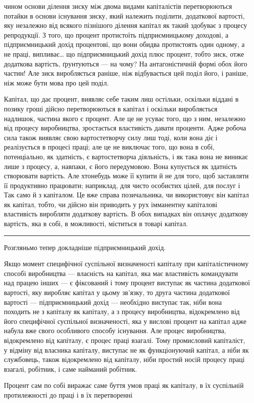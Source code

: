 \parcont{}  %
чином основи ділення зиску між двома видами капіталістів перетворюються
потайки в основи існування зиску, який належить
поділити, додаткової вартості, яку незалежно від всякого пізнішого
ділення капітал як такий здобуває з процесу репродукції.
З того, що процент протистоїть підприємницькому доходові, а
підприємницький дохід процентові, що вони обидва протистоять
один одному, а не праці, випливає\dots{} що підприємницький дохід
плюс процент, тобто зиск, отже додаткова вартість, ґрунтуються
— на чому? На антагоністичній формі обох його частин!
Але зиск виробляється раніше, ніж відбувається цей поділ його,
і раніше, ніж може бути мова про цей поділ.

Капітал, що дає процент, виявляє себе таким лиш остільки,
оскільки віддані в позику гроші дійсно перетворюються в капітал
і оскільки виробляється надлишок, частина якого є процент.
Але це не усуває того, що з ним, незалежно від процесу виробництва,
зростається властивість давати проценти. Адже робоча
сила також виявляє свою вартостетворчу силу лиш тоді, коли
вона діє і реалізується в процесі праці; але це не виключає того,
що вона в собі, потенціально, як здатність, є вартостетворча
діяльність, і як така вона не виникає лише з процесу, а, навпаки,
є його передумовою. Вона купується як здатність створювати
вартість. Але хтонебудь може її купити й не для того, щоб заставляти
її продуктивно працювати; наприклад, для чисто особистих
цілей, для послуг і~ Так само й з капіталом. Це вже справа
позичальника, чи використовує він капітал як капітал, тобто,
чи дійсно він приводить у рух імманентну капіталові властивість
виробляти додаткову вартість. В обох випадках він оплачує
додаткову вартість, яка в собі, в можливості, міститься в товарі
капітал.

\pfbreak

\noindent{}
Розгляньмо тепер докладніше підприємницький дохід.

Якщо момент специфічної суспільної визначеності капіталу
при капіталістичному способі виробництва — власність на капітал,
яка має властивість командувати над працею інших — є фіксований
і тому процент виступає як частина додаткової вартості, яку
виробляє капітал у цьому зв’язку, то друга частина додаткової
вартості — підприємницький дохід — необхідно виступає так, ніби
вона походить не з капіталу як капіталу, а з процесу виробництва,
відокремлено від його специфічної суспільної визначеності,
яка у вислові процент на капітал адже набула вже
свого особливого способу існування. Але процес виробництва,
відокремлено від капіталу, є процес праці взагалі. Тому промисловий
капіталіст, у відміну від власника капіталу, виступає не
як функціонуючий капітал, а ніби як службовець, також відокремлено
від капіталу, ніби простий носій процесу праці взагалі,
робітник, і саме найманий робітник.

Процент сам по собі виражає саме буття умов праці як капіталу,
в їх суспільній протилежності до праці і в їх перетворенні
\parbreak{}  %
